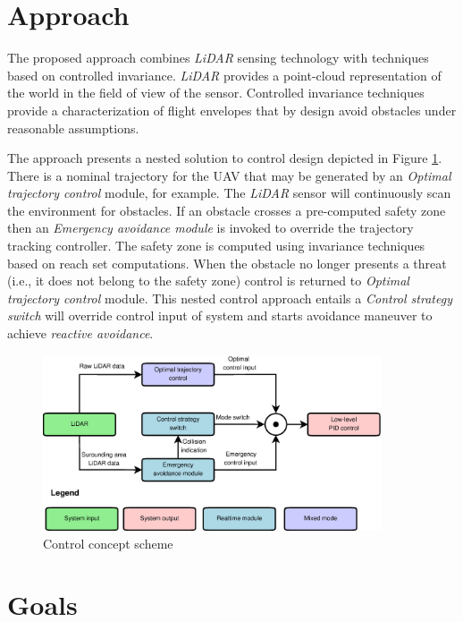 \section*{Approach}\label{ch:approach}
The proposed approach combines \textit{LiDAR} sensing technology with techniques based on controlled invariance. \textit{LiDAR} provides a point-cloud representation of the world in the field of view of the sensor. Controlled invariance techniques provide a characterization of flight envelopes that by design avoid obstacles under reasonable assumptions. 

The approach presents a nested solution to control design depicted in Figure \ref{fig:ControlConcept}. There is a nominal trajectory for the UAV that may be generated by an  \textit{Optimal trajectory control} module, for example. The \textit{LiDAR} sensor will continuously scan the environment for obstacles. If an obstacle crosses a pre-computed safety zone then an \textit{Emergency avoidance module} is invoked to override the trajectory tracking controller. The safety zone is computed using invariance techniques based on reach set computations. When the obstacle no longer presents a threat (i.e., it does not belong to the safety zone) control is returned to \textit{Optimal trajectory control} module. This nested control approach entails  a \textit{Control strategy switch} will override control input of system and starts avoidance maneuver to achieve \textit{reactive avoidance}.
 
\begin{figure}[H]
    \centering
    \includegraphics[width=10cm]{Pics/35_ControlConcept.eps}
    \caption{Control concept scheme}
    \label{fig:ControlConcept}
\end{figure}


\section*{Goals}

